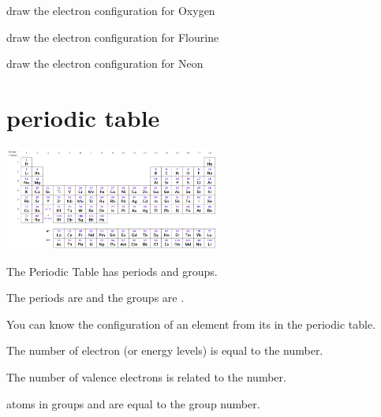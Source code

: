 \documentclass[12pt]{exam}
\begin{document}
\begin{questions}
\question draw the electron configuration for Oxygen  


\question draw the electron configuration for Flourine  



\question draw the electron configuration for Neon  


\pagebreak

\section{periodic table}


\includegraphics[width=7cm]{../../../../public/images/ptable_white.png}



\question The Periodic Table has \fillin[7][1cm] periods and \fillin[18][1cm] groups.

\question The periods are \fillin[horizontal][3cm] and the groups are \fillin[vertical][3cm]. 

\question You can know the \fillin[electron][3cm] configuration of an element from its \fillin[position][3cm] in the periodic table.

\question The number of electron \fillin[shells][2cm] (or energy levels) is equal to the \fillin[period][2cm] number.

\question The number of valence electrons is related to the \fillin[group][2cm] number.

\question atoms in groups \fillin[one][2cm] and \fillin[two][2cm] are equal to the group number.


\end{questions}
\end{document}
